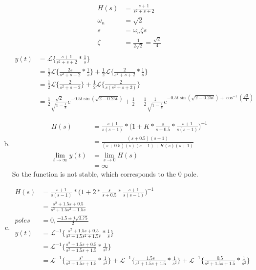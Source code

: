 \documentclass[12pt]{article}
\begin{document}
\begin{enumerate}[a.]
\begin{align*}
        H(s) &= \frac{s+1}{s^2 + s + 2}\\
        \omega_n &= \sqrt{2}\\
        s &= \omega_n\zeta s\\
        \zeta &= \frac{1}{2\sqrt{2}} = \frac{\sqrt{2}}{4}\\
    \end{align*}
    \begin{align*}
        y(t) &= \mathcal{L} \bigg\{ \frac{s+1}{s^2 + s + 2} * \frac{1}{s}\bigg\}\\
        &= \frac{1}{2} \mathcal{L} \bigg\{ \frac{2s}{s^2 + s + 2} * \frac{1}{s}\bigg\} + \frac{1}{2}\mathcal{L} \bigg\{ \frac{2}{s^2 + s + 2} * \frac{1}{s}\bigg\}\\
        &= \frac{1}{2} \mathcal{L} \bigg\{ \frac{2}{s^2 + s + 2}\bigg\} + \frac{1}{2}\mathcal{L} \bigg\{ \frac{2}{s(s^2 + s + 2)}\bigg\}\\
        &= \frac{1}{2} \frac{\sqrt{2}}{\sqrt{1-\frac{1}{8}}} e^{-0.5t\sin(\sqrt{2-0.25t})}+ \frac{1}{2} - \frac{1}{2}\frac{1}{\sqrt{1-\frac{1}{8}}} e^{-0.5t\sin(\sqrt{2-0.25t}) + \cos^{-1}(\frac{\sqrt{2}}{4})}
    \end{align*}
    \item
    \begin{align*}
        H(s) &= \frac{s+1}{s(s-1)} * \bigg( 1 + K * \frac{s}{s+0.5} * \frac{s+1}{s(s-1)} \bigg)^{-1} \\
        &= \frac{(s+0.5)(s+1)}{(s+0.5)(s)(s-1) + K(s)(s+1)}\\
        \displaystyle\lim_{t \to \infty} y(t) &= \displaystyle\lim_{s \to 0} H(s)\\
        &= \infty
    \end{align*}
    So the function is not stable, which corresponds to the 0 pole.
    \item
    \begin{align*}
        H(s) &= \frac{s+1}{s(s-1)} * \bigg( 1 + 2 * \frac{s}{s+0.5} * \frac{s+1}{s(s-1)} \bigg)^{-1} \\
        &= \frac{s^2 + 1.5s + 0.5}{s^3 + 1.5s^2 + 1.5s}\\
        poles &= 0, \frac{-1.5 \pm j\sqrt{3.75}}{2}\\
        y(t) &= \mathcal{L}^{-1} \bigg\{\frac{s^2 + 1.5s + 0.5}{s^3 + 1.5s^2 + 1.5s} * \frac{1}{s} \bigg\}\\
        &= \mathcal{L}^{-1} \bigg\{\frac{s^2 + 1.5s + 0.5}{s^2 + 1.5s + 1.5} * \frac{1}{s^2} \bigg\}\\
        &=\mathcal{L}^{-1} \bigg\{\frac{s^2}{s^2 + 1.5s + 1.5} * \frac{1}{s^2} \bigg\} +\mathcal{L}^{-1} \bigg\{\frac{1.5s}{s^2 + 1.5s + 1.5} * \frac{1}{s^2} \bigg\} + \mathcal{L}^{-1} \bigg\{\frac{0.5}{s^2 + 1.5s + 1.5} * \frac{1}{s^2} \bigg\}\\

\end{align*}
\end{enumerate}
\end{document}
